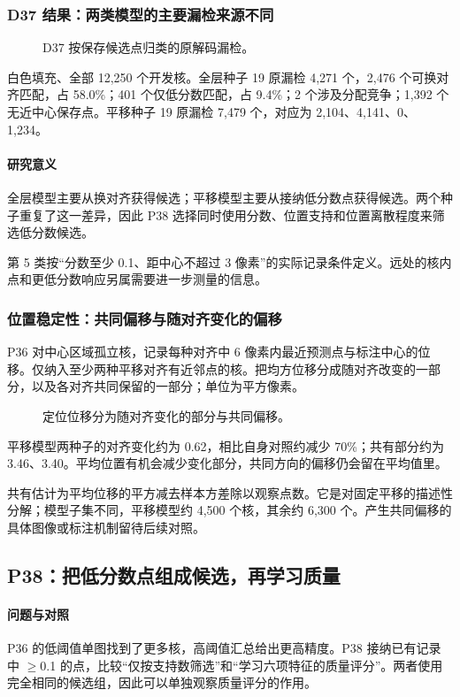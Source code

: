 \documentclass[
  12pt,
  fontset=fandol]{ctexart}
\begin{document}
\subsubsection{D37 结果：两类模型的主要漏检来源不同}\label{chapter30}
\begin{figure}[H]\centering\caption{D37 按保存候选点归类的原解码漏检。}\end{figure}
白色填充、全部 12,250 个开发核。全层种子 19 原漏检 4,271 个，2,476 个可换对齐匹配，占 58.0\%；401 个仅低分数匹配，占 9.4\%；2 个涉及分配竞争；1,392 个无近中心保存点。平移种子 19 原漏检 7,479 个，对应为 2,104、4,141、0、1,234。

\paragraph{研究意义}
全层模型主要从换对齐获得候选；平移模型主要从接纳低分数点获得候选。两个种子重复了这一差异，因此 P38 选择同时使用分数、位置支持和位置离散程度来筛选低分数候选。

第 5 类按“分数至少 0.1、距中心不超过 3 像素”的实际记录条件定义。远处的核内点和更低分数响应另属需要进一步测量的信息。

\subsubsection{位置稳定性：共同偏移与随对齐变化的偏移}\label{chapter31}
P36 对中心区域孤立核，记录每种对齐中 6 像素内最近预测点与标注中心的位移。仅纳入至少两种平移对齐有近邻点的核。把均方位移分成随对齐改变的一部分，以及各对齐共同保留的一部分；单位为平方像素。

\begin{figure}[H]\centering\caption{定位位移分为随对齐变化的部分与共同偏移。}\end{figure}
平移模型两种子的对齐变化约为 0.62，相比自身对照约减少 70\%；共有部分约为 3.46、3.40。平均位置有机会减少变化部分，共同方向的偏移仍会留在平均值里。

共有估计为平均位移的平方减去样本方差除以观察点数。它是对固定平移的描述性分解；模型子集不同，平移模型约 4,500 个核，其余约 6,300 个。产生共同偏移的具体图像或标注机制留待后续对照。

\subsection{P38：把低分数点组成候选，再学习质量}\label{chapter32}
\paragraph{问题与对照}
P36 的低阈值单图找到了更多核，高阈值汇总给出更高精度。P38 接纳已有记录中 \ensuremath{\geq}0.1 的点，比较“仅按支持数筛选”和“学习六项特征的质量评分”。两者使用完全相同的候选组，因此可以单独观察质量评分的作用。
\end{document}
